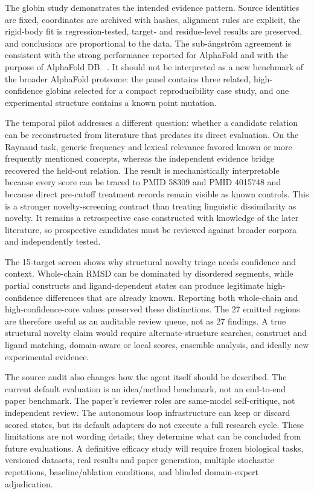 \documentclass[11pt]{article}
\begin{document}
The globin study demonstrates the intended evidence pattern. Source identities are fixed, coordinates are archived with hashes, alignment rules are explicit, the rigid-body fit is regression-tested, target- and residue-level results are preserved, and conclusions are proportional to the data. The sub-ångström agreement is consistent with the strong performance reported for AlphaFold and with the purpose of AlphaFold DB ~\cite{ref7,ref10}. It should not be interpreted as a new benchmark of the broader AlphaFold proteome: the panel contains three related, high-confidence globins selected for a compact reproducibility case study, and one experimental structure contains a known point mutation.

The temporal pilot addresses a different question: whether a candidate relation can be reconstructed from literature that predates its direct evaluation. On the Raynaud task, generic frequency and lexical relevance favored known or more frequently mentioned concepts, whereas the independent evidence bridge recovered the held-out relation. The result is mechanistically interpretable because every score can be traced to PMID 58309 and PMID 4015748 and because direct pre-cutoff treatment records remain visible as known controls. This is a stronger novelty-screening contract than treating linguistic dissimilarity as novelty. It remains a retrospective case constructed with knowledge of the later literature, so prospective candidates must be reviewed against broader corpora and independently tested.

The 15-target screen shows why structural novelty triage needs confidence and context. Whole-chain RMSD can be dominated by disordered segments, while partial constructs and ligand-dependent states can produce legitimate high-confidence differences that are already known. Reporting both whole-chain and high-confidence-core values preserved these distinctions. The 27 emitted regions are therefore useful as an auditable review queue, not as 27 findings. A true structural novelty claim would require alternate-structure searches, construct and ligand matching, domain-aware or local scores, ensemble analysis, and ideally new experimental evidence.

The source audit also changes how the agent itself should be described. The current default evaluation is an idea/method benchmark, not an end-to-end paper benchmark. The paper's reviewer roles are same-model self-critique, not independent review. The autonomous loop infrastructure can keep or discard scored states, but its default adapters do not execute a full research cycle. These limitations are not wording details; they determine what can be concluded from future evaluations. A definitive efficacy study will require frozen biological tasks, versioned datasets, real results and paper generation, multiple stochastic repetitions, baseline/ablation conditions, and blinded domain-expert adjudication.
\end{document}
